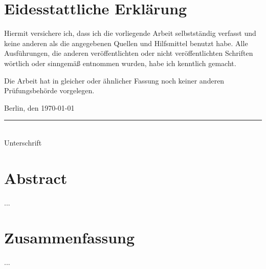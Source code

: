\BlankPage

\chapter*{Eidesstattliche Erklärung}
Hiermit versichere ich, dass ich die vorliegende Arbeit selbstständig verfasst und keine anderen als die angegebenen Quellen und Hilfsmittel benutzt habe. Alle Ausführungen, die anderen veröffentlichten oder nicht veröffentlichten Schriften wörtlich oder sinngemäß entnommen wurden, habe ich kenntlich gemacht.

Die Arbeit hat in gleicher oder ähnlicher Fassung noch keiner anderen Prüfungsbehörde vorgelegen.
\vspace{10mm}

Berlin, den \today\\

\vspace{1cm}
\rule{.5\textwidth}{.5pt}\\
Unterschrift

\BlankPage

\chapter*{Abstract}
...

\BlankPage

\chapter*{Zusammenfassung}
...

\BlankPage

\tableofcontents
\listoffigures
\listoftables

